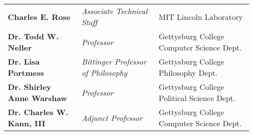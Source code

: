 \documentclass[11pt]{article}
\begin{document}
\begin{tabular}{ l l l }
  	\textbf{Charles E. Rose} & \textit{Associate Technical Staff} & MIT Lincoln Laboratory \\
  	\textbf{Dr. Todd W. Neller} & \textit{Professor} & Gettysburg College Computer Science Dept. \\
  	  	\textbf{Dr. Lisa Portmess} & \textit{Bittinger Professor of Philosophy} & Gettysburg College Philosophy Dept. \\
  	\textbf{Dr. Shirley Anne Warshaw} & \textit{Professor} & Gettysburg College Political Science Dept. \\
  	\textbf{Dr. Charles W. Kann, III} & \textit{Adjunct Professor} & Gettysburg College Computer Science Dept. \\

\end{tabular}
\end{document}
